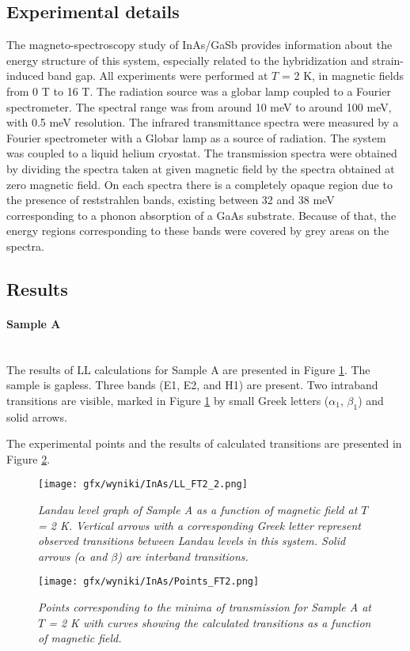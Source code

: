 \documentclass[titlepage,a4paper]{book}
\newcommand{\wciecie}{\quad\phantom{v}}
\newcommand{\myparagraph}[1]{\paragraph{#1}\mbox{}\\}
\begin{document}
\subsection{Experimental details}
\wciecie
The magneto-spectroscopy study of InAs/GaSb provides information about the energy structure of this system, especially related to the hybridization and strain-induced band gap. All experiments were performed at $T$ = 2 K, in magnetic fields from 0 T to 16 T. The radiation source was a globar lamp coupled to a Fourier spectrometer. The spectral range was from around 10 meV to around 100 meV, with 0.5 meV resolution. The infrared transmittance spectra were measured by a Fourier spectrometer with a Globar lamp as a source of radiation. The system was coupled to a liquid helium cryostat. The transmission spectra were obtained by dividing the spectra taken at given magnetic field by the spectra obtained at zero magnetic field. On each spectra there is a completely opaque region due to the presence of reststrahlen bands, existing between 32 and 38 meV corresponding to a phonon absorption of a GaAs substrate. Because of that, the energy regions corresponding to these bands were covered by grey areas on the spectra.


\subsection{Results}
\myparagraph{Sample A}
\wciecie
The results of LL calculations for Sample A are presented in Figure \ref{fig:LL_FT2}. The sample is gapless. Three bands (E1, E2, and H1) are present. Two intraband transitions are visible, marked in Figure \ref{fig:LL_FT2} by small Greek letters ($\alpha_1$, $\beta_1$) and solid arrows. 

The experimental points and the results of calculated transitions are presented in Figure \ref{fig:Points_FT2}. 

\begin{figure}[ht]
	\centering
	\texttt{[image: gfx/wyniki/InAs/LL\_FT2\_2.png]}
	\vspace{-10pt}
	\caption{\textit{Landau level graph of Sample A as a function of magnetic field at $T$ = 2 K. Vertical arrows with a corresponding Greek letter represent observed transitions between Landau levels in this system. Solid arrows ($\alpha$ and $\beta$) are interband transitions.}}
	\label{fig:LL_FT2}
\end{figure}

\begin{figure}[H]
	\centering
	\texttt{[image: gfx/wyniki/InAs/Points\_FT2.png]}
	\vspace{-10pt}
	\caption{\textit{Points corresponding to the minima of transmission for Sample A at $T$ = 2 K with curves showing the calculated transitions as a function of magnetic field.}}
	\label{fig:Points_FT2}
\end{figure}
\end{document}
